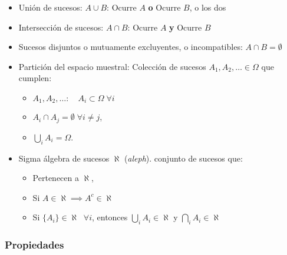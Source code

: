 \documentclass[
]{article}
\providecommand{\tightlist}{%
  \setlength{\itemsep}{0pt}\setlength{\parskip}{0pt}}
\begin{document}
\begin{itemize}
\tightlist
\item
  Unión de sucesos: \(A \cup B\): Ocurre \(A\) \textbf{o} Ocurre \(B\),
  o los dos
\item
  Intersección de sucesos: \(A \cap B\): Ocurre \(A\) \textbf{y} Ocurre
  \(B\)
\item
  Sucesos disjuntos o mutuamente excluyentes, o incompatibles:
  \(A \cap B = \emptyset\)
\item
  Partición del espacio muestral: Colección de sucesos
  \(A_1, A_2, \ldots \in \Omega\) que cumplen:

  \begin{itemize}
  \tightlist
  \item
    \(A_1, A_2, \ldots: \quad A_i \subset \Omega \; \forall i\)
  \item
    \(A_i \cap A_j = \emptyset \; \forall i \neq j\),
  \item
    \(\displaystyle \underset{i}\bigcup A_i = \Omega\).
  \end{itemize}
\item
  Sigma álgebra de sucesos \(\aleph\) (\emph{aleph}). conjunto de
  sucesos que:

  \begin{itemize}
  \tightlist
  \item
    Pertenecen a \(\aleph\),
  \item
    Si \(A \in \aleph \implies A^c \in \aleph\)
  \item
    Si \(\{A_i\}\in \aleph\;\; \forall i\), entonces
    \(\displaystyle \underset{i}\bigcup A_i \in \aleph\) y
    \(\displaystyle \underset{i}\bigcap A_i \in \aleph\)
  \end{itemize}
\end{itemize}

\hypertarget{propiedades}{%
\subsubsection{Propiedades}\label{propiedades}}
\end{document}
